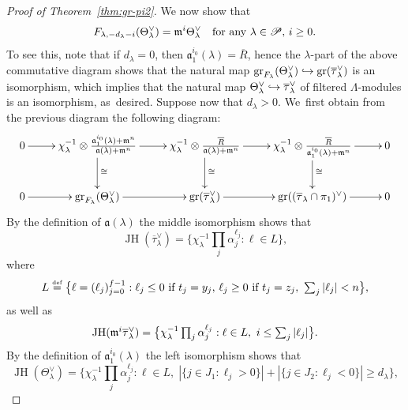\documentclass[JEP,XML,SOM,Unicode,NoFloatCountersInSection, NoEqCountersInSection,published]{cedram}
\newcommand\hto{\mathrel{\lhook\joinrel\to}}
\let\ovl\overline
\newcommand{\defeq}{\stackrel{\textrm{\tiny{\upshape{def}}}}{=}}
\renewcommand{\P}{\mathscr P}
\DeclareMathOperator{\gr}{gr}
\DeclareMathOperator{\JH}{\mathrm{JH}}
\theoremstyle{plain}
\theoremstyle{definition}
\begin{document}
\begin{proof}[Proof of Theorem~\ref{thm:gr-pi2}]
We now show that
\begin{equation}\label{eq:compare-fil}
\text{$F_{\lambda,-d_\lambda-i}(\Theta_\lambda^\vee) = \m^i \Theta_\lambda^\vee$ \ \ for any $\lambda \in \P$, $i \ge 0$.}
\end{equation}
To see this, note that if $d_\lambda = 0$, then $\mathfrak{a}_1^{i_0}(\lambda) = \ovl R$, hence the $\lambda$-part of the above commutative diagram shows that the natural map $\gr_{F_\lambda}(\Theta_\lambda^\vee) \hto \gr(\ovl\tau_\lambda^\vee)$ is an isomorphism, which implies that the natural map $\Theta_\lambda^\vee \hto \ovl\tau_\lambda^\vee$ of filtered $\Lambda$-modules is an isomorphism, as~desired.
Suppose now that $d_\lambda > 0$. We~first obtain from the previous diagram the following diagram:
\begin{equation*}
\xymatrix{
0 \ar[r] & \chi_\lambda^{-1} \otimes \frac{\mathfrak{a}_1^{i_0}(\lambda) + \m^n}{\mathfrak{a}(\lambda)+\m^n} \ar[r]\ar^{\cong}[d] & \chi_\lambda^{-1} \otimes \frac{\ovl R}{\mathfrak{a}(\lambda)+\m^n} \ar[r]\ar^{\cong}[d] & \chi_\lambda^{-1} \otimes \frac{\ovl R}{\mathfrak{a}_1^{i_0}(\lambda)+\m^n} \ar[r]\ar^{\cong}[d] & 0 \\
0 \ar[r] & \gr_{F_\lambda}(\Theta_\lambda^\vee) \ar[r] & \gr(\ovl\tau_\lambda^\vee) \ar[r] & \gr((\ovl\tau_\lambda \cap \pi_1)^\vee) \ar[r] & 0
}
\end{equation*}
By the definition of $\mathfrak{a}(\lambda)$ the middle isomorphism shows that\vspace*{-3pt}
\begin{equation*}\textstyle
\JH(\ovl\tau_\lambda^\vee) = \big\{ \chi_\lambda^{-1} \prod_j \alpha_j^{\ell_j}: \ell \in L \big\},
\end{equation*}
where\vspace*{-3pt}
\begin{equation*}\textstyle
L \defeq \big\{ \ell = (\ell_j)_{j=0}^{f-1}: \text{$\ell_j \le 0$ if $t_j = y_j$, $\ell_j \ge 0$ if $t_j = z_j$},\ \sum_j |\ell_j| < n \big\},
\end{equation*}
as well as\vspace*{-3pt}
\begin{equation*}\textstyle
\JH(\m^i \ovl\tau_\lambda^\vee) = \big\{ \chi_\lambda^{-1} \prod_j \alpha_j^{\ell_j}: \ell \in L,\ i \le \sum_j |\ell_j| \big\}.
\end{equation*}
By the definition of $\mathfrak{a}_1^{i_0}(\lambda)$ the left isomorphism shows that
\begin{equation*}\textstyle
\JH(\Theta_\lambda^\vee) = \big\{ \chi_\lambda^{-1} \prod_j \alpha_j^{\ell_j}: \ell \in L,\; |\{j \in J_1: \ell_j > 0\}|+|\{j \in J_2: \ell_j < 0\}| \ge d_\lambda \big\},

\end{equation*}
\end{proof}
\end{document}

